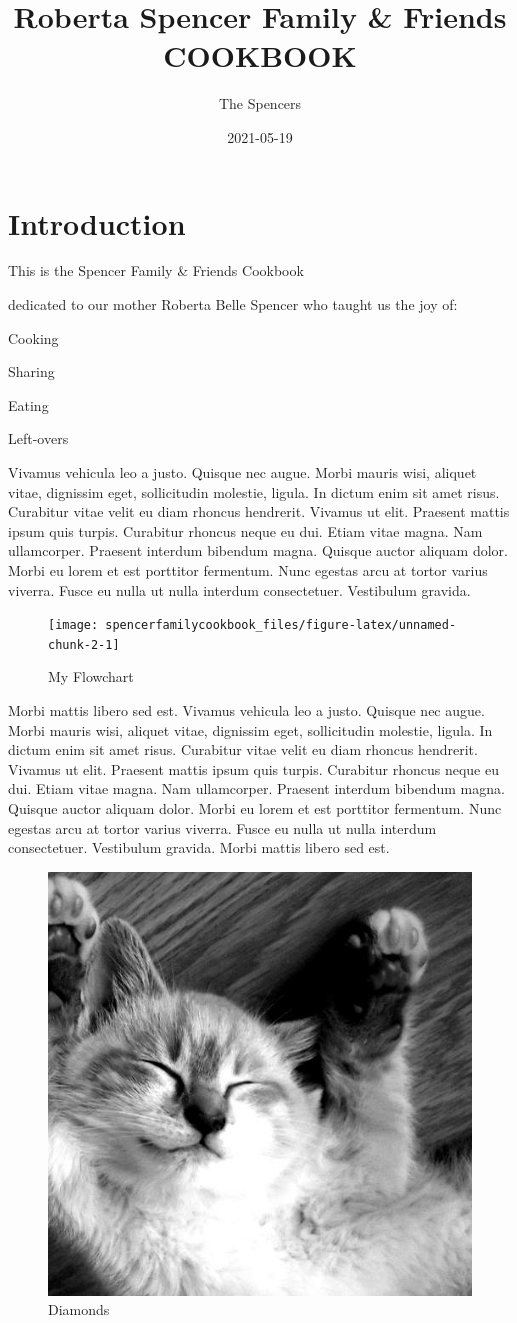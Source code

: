 \documentclass[
]{book}
\title{Roberta Spencer Family \& Friends COOKBOOK}
\author{The Spencers}
\date{2021-05-19}
\begin{document}
\maketitle

{
\setcounter{tocdepth}{1}
\tableofcontents
}
\hypertarget{introduction}{%
\chapter{Introduction}\label{introduction}}

This is the Spencer Family \& Friends Cookbook

dedicated to our mother Roberta Belle Spencer who taught us the joy of:

Cooking

Sharing

Eating

Left-overs

Vivamus vehicula leo a justo. Quisque nec augue. Morbi mauris wisi, aliquet vitae, dignissim eget, sollicitudin molestie, ligula. In dictum enim sit amet risus. Curabitur vitae velit eu diam rhoncus hendrerit. Vivamus ut elit. Praesent mattis ipsum quis turpis. Curabitur rhoncus neque eu dui. Etiam vitae magna. Nam ullamcorper. Praesent interdum bibendum magna. Quisque auctor aliquam dolor. Morbi eu lorem et est porttitor fermentum. Nunc egestas arcu at tortor varius viverra. Fusce eu nulla ut nulla interdum consectetuer. Vestibulum gravida.

\begin{figure}

\hfill{}\texttt{[image: spencerfamilycookbook\_files/figure-latex/unnamed-chunk-2-1]} 

\caption{My Flowchart}\label{fig:unnamed-chunk-2}
\end{figure}

Morbi mattis libero sed est. Vivamus vehicula leo a justo. Quisque nec augue. Morbi mauris wisi, aliquet vitae, dignissim eget, sollicitudin molestie, ligula. In dictum enim sit amet risus. Curabitur vitae velit eu diam rhoncus hendrerit. Vivamus ut elit. Praesent mattis ipsum quis turpis. Curabitur rhoncus neque eu dui. Etiam vitae magna. Nam ullamcorper. Praesent interdum bibendum magna. Quisque auctor aliquam dolor. Morbi eu lorem et est porttitor fermentum. Nunc egestas arcu at tortor varius viverra. Fusce eu nulla ut nulla interdum consectetuer. Vestibulum gravida. Morbi mattis libero sed est.

\begin{figure}  
 \begin{center}
    \includegraphics[width=.2\textwidth]{"images/500.jpg"}
  \caption{Diamonds} 
\end{center}
\end{figure}
\end{document}
